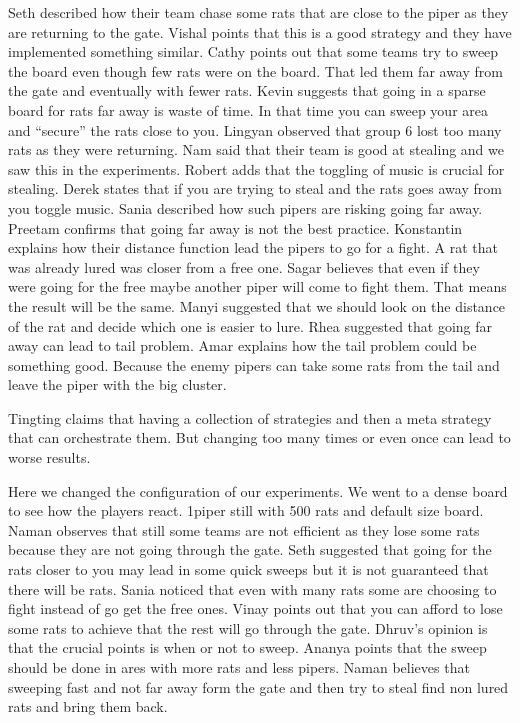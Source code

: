 Seth described how their team chase some rats that are close to the piper as they 
are returning to the gate.
Vishal points that this is a good strategy and they have implemented something similar.
Cathy points out that some teams try to sweep the board even though few rats were 
on the board. That led them far away from the gate and eventually with fewer rats.
Kevin suggests that going in a sparse board for rats far away is waste of time. 
In that time you can sweep your area and “secure” the rats close to you.
Lingyan observed that group 6 lost too many rats as they were returning.
Nam said that their team is good at stealing and we saw this in the experiments.
Robert adds that the toggling of music is crucial for stealing.
Derek states that if you are trying to steal and the rats goes away from you toggle music.
Sania described how such pipers are risking going far away.
Preetam confirms that going far away is not the best practice.
Konstantin explains how their distance function lead the pipers to go for a fight. 
A rat that was already lured was closer from a free one.
Sagar believes that even if they were going for the free maybe another piper will 
come to fight them. That means the result will be the same.
Manyi suggested that we should look on the distance of the rat and decide which 
one is easier to lure.
Rhea suggested that going far away can lead to tail problem.
Amar explains how the tail problem could be something good. Because the enemy 
pipers can take some rats from the tail and leave the piper with the big cluster.

Tingting claims that having a collection of strategies and then a meta strategy 
that can orchestrate them. But changing too many times or even once can lead to 
worse results.

Here we changed the configuration of our experiments. We went to a dense board to 
see how the players react. 1piper still with 500 rats and default size board.
Naman observes that still some teams are not efficient as they lose some rats 
because they are not going through the gate.
Seth suggested that going for the rats closer to you may lead in some quick sweeps 
but it is not guaranteed that there will be rats.
Sania noticed that even with many rats some are choosing to fight instead of go get the free ones.
Vinay points out that you can afford to lose some rats to achieve that the rest will go through the gate.
Dhruv’s opinion is that the crucial points is when or not to sweep.
Ananya points that the sweep should be done in ares with more rats and less pipers.
Naman believes that sweeping fast and not far away form the gate and then try to 
steal find non lured rats and bring them back.

